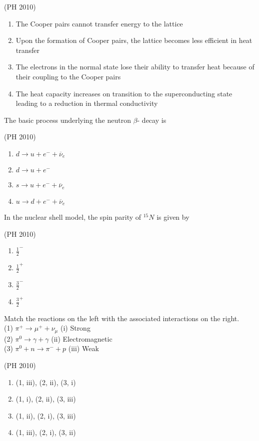 \hfill{(PH 2010)}

\begin{enumerate}
\item The Cooper pairs cannot transfer energy to the lattice 
\item Upon the formation of Cooper pairs, the lattice becomes less efficient in heat transfer
\item The electrons in the normal state lose their ability to transfer heat because of their coupling to the Cooper pairs 
\item  The heat capacity increases on transition to the superconducting state leading to a reduction in thermal conductivity
\end{enumerate}



\item The basic process underlying the neutron $\beta$- decay is 


\hfill{(PH 2010)}
\begin{multicols}{2}
\begin{enumerate}
\item $d \rightarrow u + e^- + \overline{\nu}_e$
\item $d \rightarrow u + e^-$ 
\item $s \rightarrow u + e^- + \overline{\nu}_e$ 
\item $u \rightarrow d + e^- + \overline{\nu}_e$
\end{enumerate}
\end{multicols}

\item In the nuclear shell model, the spin parity of $^{15}N$ is given by 

\hfill{(PH 2010)}
\begin{multicols}{4}
\begin{enumerate}
\item $\frac{1}{2}^{-}$ 
\item $\frac{1}{2}^{+}$ 
\item $\frac{3}{2}^{-}$ 
\item $\frac{3}{2}^{+}$ 
\end{enumerate}
\end{multicols}



\item Match the reactions on the left with the associated interactions on the right. \\
(1) $\pi^+ \rightarrow \mu^+ + \nu_{\mu}$  \quad \qquad \qquad \qquad (i) Strong \\
(2) $\pi^0 \rightarrow \gamma + \gamma$ \qquad \qquad \qquad \qquad (ii) Electromagnetic\\ 
(3) $\pi^0 + n \rightarrow \pi^- + p$ \qquad \qquad \qquad (iii) Weak 


\hfill{(PH 2010)}
\begin{multicols}{2}
\begin{enumerate}
\item (1, iii), (2, ii), (3, i) 
\item (1, i), (2, ii), (3, iii) 
\item (1, ii), (2, i), (3, iii) 
\item (1, iii), (2, i), (3, ii)
\end{enumerate}
\end{multicols}



